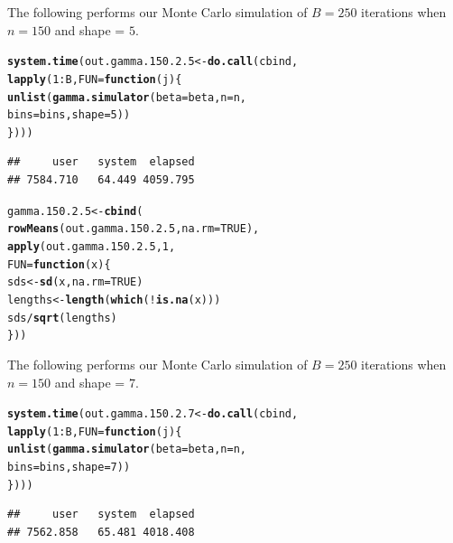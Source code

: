 \documentclass[11pt]{article}\usepackage[]{graphicx}\usepackage[]{color}
\makeatletter
\newcommand{\hlnum}[1]{\textcolor[rgb]{0.686,0.059,0.569}{#1}}%
\newcommand{\hlopt}[1]{\textcolor[rgb]{0,0,0}{#1}}%
\newcommand{\hlstd}[1]{\textcolor[rgb]{0.345,0.345,0.345}{#1}}%
\newcommand{\hlkwa}[1]{\textcolor[rgb]{0.161,0.373,0.58}{\textbf{#1}}}%
\newcommand{\hlkwb}[1]{\textcolor[rgb]{0.69,0.353,0.396}{#1}}%
\newcommand{\hlkwc}[1]{\textcolor[rgb]{0.333,0.667,0.333}{#1}}%
\newcommand{\hlkwd}[1]{\textcolor[rgb]{0.737,0.353,0.396}{\textbf{#1}}}%
\newenvironment{kframe}{%
 \def\at@end@of@kframe{}%
 \ifinner\ifhmode%
  \def\at@end@of@kframe{\end{minipage}}%
  \begin{minipage}{\columnwidth}%
 \fi\fi%
 \def\FrameCommand##1{\hskip\@totalleftmargin \hskip-\fboxsep
 \colorbox{shadecolor}{##1}\hskip-\fboxsep
     \hskip-\linewidth \hskip-\@totalleftmargin \hskip\columnwidth}%
 \MakeFramed {\advance\hsize-\width
   \@totalleftmargin\z@ \linewidth\hsize
   \@setminipage}}%
 {\par\unskip\endMakeFramed%
 \at@end@of@kframe}
\newenvironment{knitrout}{}{} %
\makeatother
\begin{document}
The following performs our Monte Carlo simulation of $B = 250$ iterations 
when $n = 150$ and shape = $5$.

\begin{knitrout}
\color{fgcolor}\begin{kframe}
\begin{alltt}
\hlkwd{system.time}\hlstd{(out.gamma.150.2.5} \hlkwb{<-} \hlkwd{do.call}\hlstd{(cbind,}
  \hlkwd{lapply}\hlstd{(}\hlnum{1}\hlopt{:}\hlstd{B,} \hlkwc{FUN} \hlstd{=} \hlkwa{function}\hlstd{(}\hlkwc{j}\hlstd{)\{}
    \hlkwd{unlist}\hlstd{(}\hlkwd{gamma.simulator}\hlstd{(}\hlkwc{beta} \hlstd{= beta,} \hlkwc{n} \hlstd{= n,}
      \hlkwc{bins} \hlstd{= bins,} \hlkwc{shape} \hlstd{=} \hlnum{5}\hlstd{))}
\hlstd{\})))}
\end{alltt}
\begin{verbatim}
##     user   system  elapsed 
## 7584.710   64.449 4059.795
\end{verbatim}
\end{kframe}
\end{knitrout}

\begin{knitrout}
\color{fgcolor}\begin{kframe}
\begin{alltt}
\hlstd{gamma.150.2.5} \hlkwb{<-} \hlkwd{cbind}\hlstd{(}
  \hlkwd{rowMeans}\hlstd{(out.gamma.150.2.5,} \hlkwc{na.rm} \hlstd{=} \hlnum{TRUE}\hlstd{),}
  \hlkwd{apply}\hlstd{(out.gamma.150.2.5,} \hlnum{1}\hlstd{,}
  \hlkwc{FUN} \hlstd{=} \hlkwa{function}\hlstd{(}\hlkwc{x}\hlstd{)\{}
    \hlstd{sds} \hlkwb{<-} \hlkwd{sd}\hlstd{(x,} \hlkwc{na.rm} \hlstd{=} \hlnum{TRUE}\hlstd{)}
    \hlstd{lengths} \hlkwb{<-} \hlkwd{length}\hlstd{(}\hlkwd{which}\hlstd{(}\hlopt{!}\hlkwd{is.na}\hlstd{(x)))}
    \hlstd{sds} \hlopt{/} \hlkwd{sqrt}\hlstd{(lengths)}
  \hlstd{\}))}
\end{alltt}
\end{kframe}
\end{knitrout}

The following performs our Monte Carlo simulation of $B = 250$ iterations 
when $n = 150$ and shape = $7$.

\begin{knitrout}
\color{fgcolor}\begin{kframe}
\begin{alltt}
\hlkwd{system.time}\hlstd{(out.gamma.150.2.7} \hlkwb{<-} \hlkwd{do.call}\hlstd{(cbind,}
  \hlkwd{lapply}\hlstd{(}\hlnum{1}\hlopt{:}\hlstd{B,} \hlkwc{FUN} \hlstd{=} \hlkwa{function}\hlstd{(}\hlkwc{j}\hlstd{)\{}
    \hlkwd{unlist}\hlstd{(}\hlkwd{gamma.simulator}\hlstd{(}\hlkwc{beta} \hlstd{= beta,} \hlkwc{n} \hlstd{= n,}
      \hlkwc{bins} \hlstd{= bins,} \hlkwc{shape} \hlstd{=} \hlnum{7}\hlstd{))}
\hlstd{\})))}
\end{alltt}
\begin{verbatim}
##     user   system  elapsed 
## 7562.858   65.481 4018.408
\end{verbatim}
\end{kframe}
\end{knitrout}
\end{document}
